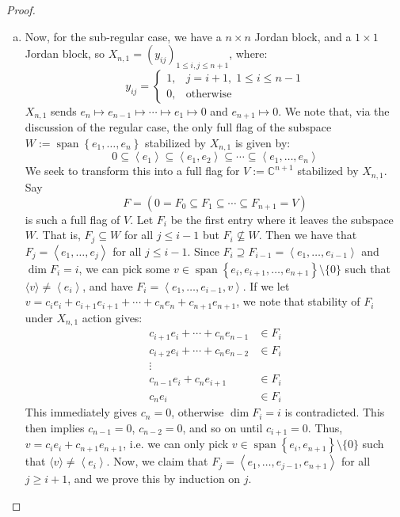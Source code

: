 \documentclass[11pt]{article}
\newcommand{\C}{\mathbb{C}}
\newcommand{\Sp}{\operatorname{span}}
\theoremstyle{definition}
\numberwithin{equation}{section} %
\begin{document}
\begin{proof}
\begin{enumerate}[(a)]
        \item Now, for the sub-regular case, we have a $n\times n$ Jordan block, and a $1\times 1$ Jordan block, so $X_{n,1} = \left(y_{ij}\right)_{1\leq i,j\leq n+1}$, where:
        $$
        y_{ij} = \begin{cases} 1, & j=i+1,\; 1\leq i\leq n-1 \\ 0, & \text{otherwise} \end{cases}
        $$
        $X_{n,1}$ sends $e_n\mapsto e_{n-1}\mapsto \cdots \mapsto e_1\mapsto 0$ and $e_{n+1}\mapsto 0$. We note that, via the discussion of the regular case, the only full flag of the subspace $W:=\Sp\left\{e_1, \ldots, e_n\right\}$ stabilized by $X_{n,1}$ is given by:
        $$
        0 \subseteq \left\langle e_1\right\rangle \subseteq \left\langle e_1, e_2\right\rangle \subseteq\cdots \subseteq \left\langle e_1, \ldots, e_n\right\rangle
        $$
        We seek to transform this into a full flag for $V:=\C^{n+1}$ stabilized by $X_{n,1}$. Say
        $$
        F = \left(0=F_0\subseteq F_1\subseteq \cdots \subseteq F_{n+1} = V\right)
        $$
        is such a full flag of $V$. Let $F_i$ be the first entry where it leaves the subspace $W$. That is, $F_j\subseteq W$ for all $j\leq i-1$ but $F_i\not\subseteq W$. Then we have that $F_j = \left\langle e_1, \ldots, e_j\right\rangle$ for all $j\leq i-1$. Since $F_i \supseteq F_{i-1} = \left\langle e_1, \ldots, e_{i-1}\right\rangle$ and $\dim F_i = i$, we can pick some $v\in \Sp\left\{e_i, e_{i+1}, \ldots, e_{n+1}\right\} \setminus \{0\}$ such that $\langle v\rangle \neq \left\langle e_i\right\rangle$, and have $F_i = \left\langle e_1, \ldots, e_{i-1}, v\right\rangle$. If we let $v=c_ie_i + c_{i+1}e_{i+1} + \cdots + c_ne_n +c_{n+1}e_{n+1}$, we note that stability of $F_i$ under $X_{n,1}$ action gives:
        \begin{align*}
        c_{i+1}e_i + \cdots + c_{n}e_{n-1} &\in F_i \\
        c_{i+2}e_i + \cdots + c_{n}e_{n-2} &\in F_i \\
        \vdots \\
        c_{n-1}e_i + c_{n}e_{i+1} &\in F_i \\
        c_{n}e_i &\in F_i
        \end{align*}
        This immediately gives $c_n =0$, otherwise $\dim F_i = i$ is contradicted. This then implies $c_{n-1}=0$, $c_{n-2}=0$, and so on until $c_{i+1}=0$. Thus, $v=c_ie_i + c_{n+1}e_{n+1}$, i.e. we can only pick $v\in \Sp\left\{e_i, e_{n+1}\right\} \setminus \{0\}$ such that $\langle v\rangle \neq \left\langle e_i\right\rangle$. Now, we claim that $F_j = \left\langle e_1, \ldots, e_{j-1}, e_{n+1}\right\rangle$ for all $j\geq i+1$, and we prove this by induction on $j$.


\end{enumerate}
\end{proof}
\end{document}
